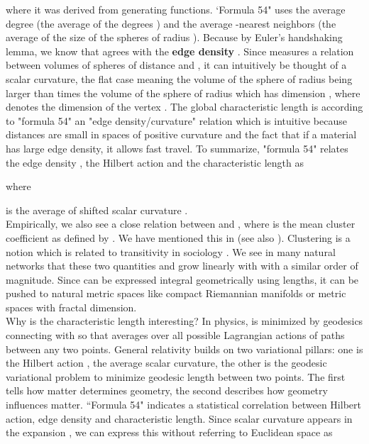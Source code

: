 \documentclass[12pt]{amsart}
\theoremstyle{definition}
\begin{document}
where it was derived from generating functions. `Formula 54"
uses the average degree  (the average of the degrees )
and the average -nearest neighbors  (the average of the size  
of the spheres of radius ). Because  by Euler's handshaking lemma, we know that 
agrees with the {\bf edge density} . Since 
measures a relation between volumes of spheres of distance  and , it can intuitively be
thought of a scalar curvature, the flat case meaning the volume
 of the sphere of radius  being larger than  times the volume   of the sphere
of radius  which has dimension , where  denotes the dimension of the vertex .
The global characteristic length is according to "formula 54"
an "edge density/curvature" relation which is intuitive because distances are small 
in spaces of positive curvature and the fact that if a material has large edge density, it 
allows fast travel. To summarize, "formula 54" relates the edge density , 
the Hilbert action  and the characteristic length  as
 
where 

is the average of shifted scalar curvature . \\ 

Empirically, we also see a close relation between  and , where  is the mean 
cluster coefficient as defined by \cite{WattsStrogatz}. We have mentioned this in 
\cite{KnillMiniatures} (see also \cite{KnillAffine,KnillOrbital3}). Clustering is a notion 
which is related to transitivity in sociology \cite{WassermanFaust}. We see in many natural networks
that these two quantities  and  grow linearly with  with a similar 
order of magnitude. Since  can be expressed integral geometrically
using lengths, it can be pushed to natural metric spaces like compact Riemannian 
manifolds or metric spaces with fractal dimension. \\

Why is the characteristic length interesting? In physics,  is minimized by geodesics
connecting  with  so that  averages over all possible Lagrangian actions of 
paths between any two points. General relativity builds on two variational pillars: one is 
the Hilbert action , the average scalar curvature, the other is the 
geodesic variational problem to minimize geodesic length between two points. 
The first tells how matter determines geometry, the second 
describes how geometry influences matter. ``Formula 54" indicates a statistical correlation between
Hilbert action, edge density and characteristic length. Since scalar curvature  appears in the expansion
, we can express this without 
referring to Euclidean space  as 
 
\end{document}
